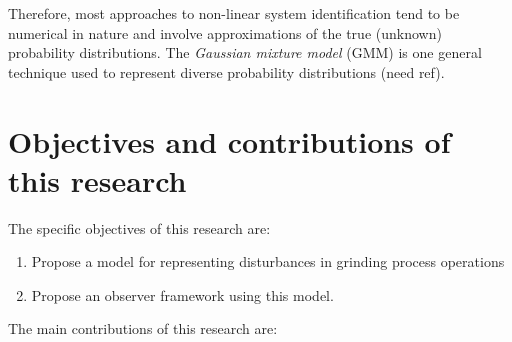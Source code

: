 Therefore, most approaches to non-linear system identification tend to be numerical in nature and involve approximations of the true (unknown) probability distributions. The \textit{Gaussian mixture model} (GMM) is one general technique used to represent diverse probability distributions (need ref).



\section{Objectives and contributions of this research}

The specific objectives of this research are:

\begin{enumerate}
	\item Propose a model for representing disturbances in grinding process operations
	\item Propose an observer framework using this model.
\end{enumerate}


The main contributions of this research are:

